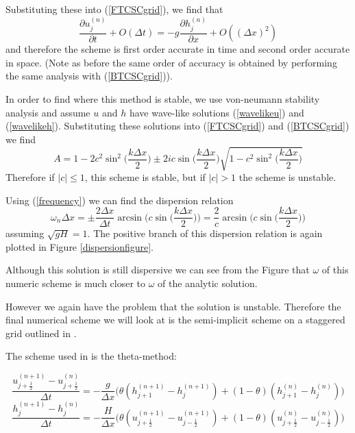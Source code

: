 \documentclass[a4paper,12pt, notitlepage]{article}
\begin{document}
Substituting these into (\ref{FTCSCgrid}), we find that 
\begin{equation}
\frac{\partial u_{j}^{(n)}}{\partial t} + O(\Delta t) =  -g \frac{\partial h_{j}^{(n)}}{\partial x} + O((\Delta x)^{2})
\end{equation} 
and therefore the scheme is first order accurate in time and second order accurate in space. (Note as before the same order of accuracy is obtained by performing the same analysis with (\ref{BTCSCgrid})).

In order to find where this method is stable, we use von-neumann stability analysis and assume $u$ and $h$ have wave-like solutions (\ref{wavelikeu}) and (\ref{wavelikeh}). Substituting these solutions into (\ref{FTCSCgrid}) and (\ref{BTCSCgrid}) we find
\begin{equation}
A = 1 - 2c^{2}\sin^{2}\bigg(\frac{k\Delta x}{2}\bigg) \pm 2ic\sin\bigg(\frac{k\Delta x}{2}\bigg) \sqrt{1 - c^{2}\sin^{2}(\frac{k\Delta x}{2}\bigg)}
\end{equation}
Therefore if $\lvert c \rvert \leq 1$, this scheme is stable, but if $\lvert c \rvert > 1$ the scheme is unstable.

Using (\ref{frequency}) we can find the dispersion relation
\begin{equation}
	\omega_{n} \Delta x = \pm\frac{2\Delta x}{\Delta t} \arcsin\bigg(c\sin\bigg(\frac{k\Delta x}{2}\bigg)\bigg) = \frac{2}{c} \arcsin\bigg(c\sin\bigg(\frac{k\Delta x}{2}\bigg)\bigg) 
\end{equation}
assuming $\sqrt{gH} = 1$. The positive branch of this dispersion relation is again plotted in Figure \ref{dispersionfigure}. 

Although this solution is still dispersive we can see from the Figure that $\omega$ of this numeric scheme is much closer to $\omega$ of the analytic solution.

However we again have the problem that the solution is unstable. Therefore the final numerical scheme we will look at is the semi-implicit scheme on a staggered grid outlined in \cite{semi-implicit}.

The scheme used in \cite{semi-implicit} is the theta-method:

\begin{equation}
\frac{u_{j + \frac{1}{2}}^{(n + 1)} - u_{j + \frac{1}{2}}^{(n)}}{\Delta t} = -\frac{g}{\Delta x} \bigg(\theta (h_{j + 1}^{(n+ 1)} - h_{j}^{(n+ 1)}) + (1 - \theta) (h_{j + 1}^{(n)} - h_{j}^{(n)})\bigg)
\end{equation}
\begin{equation}
\frac{h_{j}^{(n + 1)} - h_{j}^{(n)}}{\Delta t} = -\frac{H}{\Delta x} \bigg(\theta (u_{j + \frac{1}{2}}^{(n+ 1)} - u_{j - \frac{1}{2}}^{(n+ 1)}) + (1 - \theta) (u_{j + \frac{1}{2}}^{(n)} - u_{j - \frac{1}{2}}^{(n)})\bigg)
\end{equation}
\end{document}
